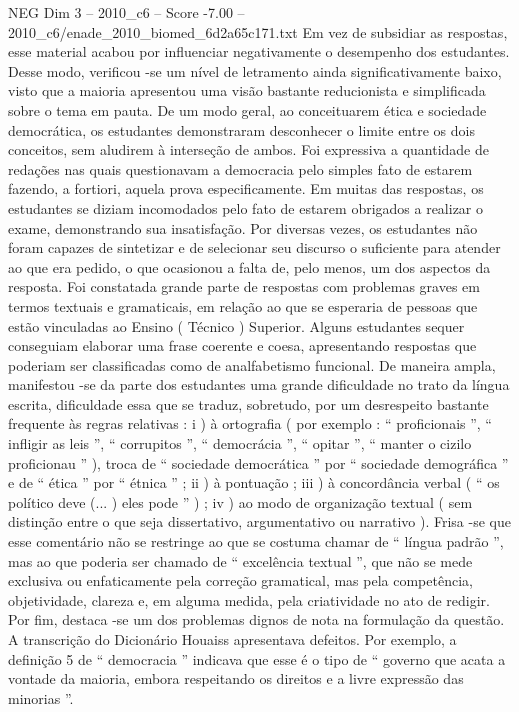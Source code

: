 \begin{textsample}{NEG Dim 3 – 2010\_c6 – Score -7.00 – 2010\_c6/enade\_2010\_biomed\_6d2a65c171.txt}
Em vez de subsidiar as respostas, esse material acabou por influenciar negativamente o desempenho dos estudantes.
Desse modo, verificou -se um nível de letramento ainda significativamente baixo, visto que a maioria apresentou uma visão bastante reducionista e simplificada sobre o tema em pauta.
De um modo geral, ao conceituarem ética e sociedade democrática, os estudantes demonstraram desconhecer o limite entre os dois conceitos, sem aludirem à interseção de ambos.
Foi expressiva a quantidade de redações nas quais questionavam a democracia pelo simples fato de estarem fazendo, a fortiori, aquela prova especificamente.
Em muitas das respostas, os estudantes se diziam incomodados pelo fato de estarem obrigados a realizar o exame, demonstrando sua insatisfação.
Por diversas vezes, os estudantes não foram capazes de sintetizar e de selecionar seu discurso o suficiente para atender ao que era pedido, o que ocasionou a falta de, pelo menos, um dos aspectos da resposta.
Foi constatada grande parte de respostas com problemas graves em termos textuais e gramaticais, em relação ao que se esperaria de pessoas que estão vinculadas ao Ensino ( Técnico ) Superior.
Alguns estudantes sequer conseguiam elaborar uma frase coerente e coesa, apresentando respostas que poderiam ser classificadas como de analfabetismo funcional.
De maneira ampla, manifestou -se da parte dos estudantes uma grande dificuldade no trato da língua escrita, dificuldade essa que se traduz, sobretudo, por um desrespeito bastante frequente às regras relativas : i ) à ortografia ( por exemplo : “ proficionais ”, “ infligir as leis ”, “ corrupitos ”, “ democrácia ”, “ opitar ”, “ manter o cizilo proficionau ” ), troca de “ sociedade democrática ” por “ sociedade demográfica ” e de “ ética ” por “ étnica ” ; ii ) à pontuação ; iii ) à concordância verbal ( “ os político deve (... ) eles pode ” ) ; iv ) ao modo de organização textual ( sem distinção entre o que seja dissertativo, argumentativo ou narrativo ).
Frisa -se que esse comentário não se restringe ao que se costuma chamar de “ língua padrão ”, mas ao que poderia ser chamado de “ excelência textual ”, que não se mede exclusiva ou enfaticamente pela correção gramatical, mas pela competência, objetividade, clareza e, em alguma medida, pela criatividade no ato de redigir.
Por fim, destaca -se um dos problemas dignos de nota na formulação da questão.
A transcrição do Dicionário Houaiss apresentava defeitos.
Por exemplo, a definição 5 de “ democracia ” indicava que esse é o tipo de “ governo que acata a vontade da maioria, embora respeitando os direitos e a livre expressão das minorias ”.

\end{textsample}

